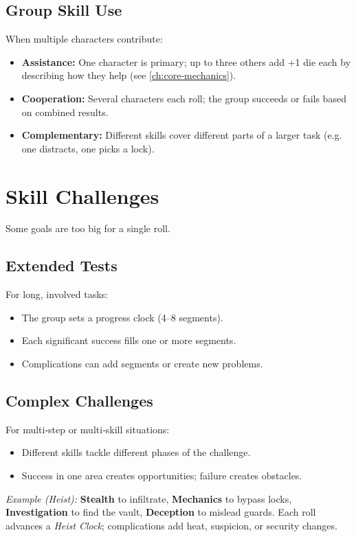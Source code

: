 \subsection{Group Skill Use}
\label{sec:group-skills}
When multiple characters contribute:
\begin{itemize}
  \item \textbf{Assistance:} One character is primary; up to three others add +1 die each by describing how they help (see \ref{ch:core-mechanics}).
  \item \textbf{Cooperation:} Several characters each roll; the group succeeds or fails based on combined results.
  \item \textbf{Complementary:} Different skills cover different parts of a larger task (e.g. one distracts, one picks a lock).
\end{itemize}

\section{Skill Challenges}
\label{sec:skill-challenges}

Some goals are too big for a single roll.

\subsection{Extended Tests}
\label{sec:extended-tests}
For long, involved tasks:
\begin{itemize}
  \item The group sets a progress clock (4–8 segments).
  \item Each significant success fills one or more segments.
  \item Complications can add segments or create new problems.
\end{itemize}

\subsection{Complex Challenges}
\label{sec:complex-challenges}
For multi‑step or multi‑skill situations:
\begin{itemize}
  \item Different skills tackle different phases of the challenge.
  \item Success in one area creates opportunities; failure creates obstacles.
\end{itemize}
\noindent\textit{Example (Heist):} \textbf{Stealth} to infiltrate, \textbf{Mechanics} to bypass
locks, \textbf{Investigation} to find the vault, \textbf{Deception} to mislead guards.
Each roll advances a \emph{Heist Clock}; complications add heat, suspicion, or
security changes.

